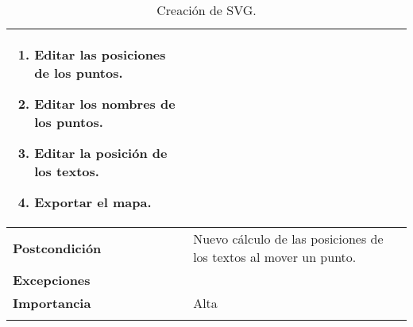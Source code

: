 \begin{longtable}[H]{@{}l|l@{}}
\begin{minipage}[t]{0.71\columnwidth}
\begin{enumerate}
			\item Editar las posiciones de los puntos.
			\item Editar los nombres de los puntos.
			\item Editar la posición de los textos.
			\item Exportar el mapa.
		\end{enumerate}
	\end{minipage}\tabularnewline
	\midrule
	\begin{minipage}[t]{0.23\columnwidth}\raggedright\strut
		\textbf{Postcondición}\strut
	\end{minipage} & \begin{minipage}[t]{0.71\columnwidth}\raggedright\strut
		Nuevo cálculo de las posiciones de los textos al mover un punto.\strut
	\end{minipage}\tabularnewline
	\midrule
	\begin{minipage}[t]{0.23\columnwidth}\raggedright\strut
		\textbf{Excepciones}\strut
	\end{minipage} & \begin{minipage}[t]{0.71\columnwidth}\raggedright

	\end{minipage}\tabularnewline
	\midrule
	\begin{minipage}[t]{0.23\columnwidth}\raggedright\strut
		\textbf{Importancia}\strut
	\end{minipage} & \begin{minipage}[t]{0.71\columnwidth}\raggedright\strut
		Alta\strut
	\end{minipage}\tabularnewline
	\bottomrule
	\caption{Creación de SVG.}
	\label{cu:3}
\end{longtable}
\newpage


